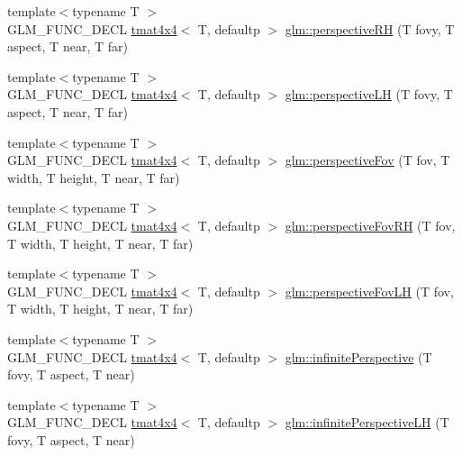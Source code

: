 \begin{DoxyCompactItemize}
{\footnotesize template$<$typename T $>$ }\\G\+L\+M\+\_\+\+F\+U\+N\+C\+\_\+\+D\+E\+CL \hyperlink{structglm_1_1tmat4x4}{tmat4x4}$<$ T, defaultp $>$ \hyperlink{group__gtc__matrix__transform_ga5a4fa9f8ffabb2294e48a18bf8fa2f5f}{glm\+::perspective\+RH} (T fovy, T aspect, T near, T far)
\item 
{\footnotesize template$<$typename T $>$ }\\G\+L\+M\+\_\+\+F\+U\+N\+C\+\_\+\+D\+E\+CL \hyperlink{structglm_1_1tmat4x4}{tmat4x4}$<$ T, defaultp $>$ \hyperlink{group__gtc__matrix__transform_ga34048da27c559f1ac8e9550d169dd6f3}{glm\+::perspective\+LH} (T fovy, T aspect, T near, T far)
\item 
{\footnotesize template$<$typename T $>$ }\\G\+L\+M\+\_\+\+F\+U\+N\+C\+\_\+\+D\+E\+CL \hyperlink{structglm_1_1tmat4x4}{tmat4x4}$<$ T, defaultp $>$ \hyperlink{group__gtc__matrix__transform_gae9146e2c550fc8646299e4b900238145}{glm\+::perspective\+Fov} (T fov, T width, T height, T near, T far)
\item 
{\footnotesize template$<$typename T $>$ }\\G\+L\+M\+\_\+\+F\+U\+N\+C\+\_\+\+D\+E\+CL \hyperlink{structglm_1_1tmat4x4}{tmat4x4}$<$ T, defaultp $>$ \hyperlink{group__gtc__matrix__transform_ga07cd8df791bf90dcb782645fe0b21261}{glm\+::perspective\+Fov\+RH} (T fov, T width, T height, T near, T far)
\item 
{\footnotesize template$<$typename T $>$ }\\G\+L\+M\+\_\+\+F\+U\+N\+C\+\_\+\+D\+E\+CL \hyperlink{structglm_1_1tmat4x4}{tmat4x4}$<$ T, defaultp $>$ \hyperlink{group__gtc__matrix__transform_gae705a2f19c3ef5ef880bd6c92759cf2d}{glm\+::perspective\+Fov\+LH} (T fov, T width, T height, T near, T far)
\item 
{\footnotesize template$<$typename T $>$ }\\G\+L\+M\+\_\+\+F\+U\+N\+C\+\_\+\+D\+E\+CL \hyperlink{structglm_1_1tmat4x4}{tmat4x4}$<$ T, defaultp $>$ \hyperlink{group__gtc__matrix__transform_ga79f704ad91a5f0d68abd88c66c8186e5}{glm\+::infinite\+Perspective} (T fovy, T aspect, T near)
\item 
{\footnotesize template$<$typename T $>$ }\\G\+L\+M\+\_\+\+F\+U\+N\+C\+\_\+\+D\+E\+CL \hyperlink{structglm_1_1tmat4x4}{tmat4x4}$<$ T, defaultp $>$ \hyperlink{group__gtc__matrix__transform_ga47af534da2b28effa4c7945ec82ccd9d}{glm\+::infinite\+Perspective\+LH} (T fovy, T aspect, T near)
\item 

\end{DoxyCompactItemize}
